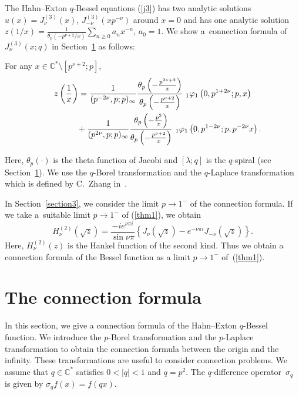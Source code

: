 \documentclass[pdftex]{sigma}
\begin{document}
The Hahn--Exton $q$-Bessel equations (\ref{j3}) has two analytic solutions $u(x)=J_\nu^{(3)}(x)$, $J_{-\nu}^{(3)}(xp^{-\nu})$ around $x=0$ and has one analytic solution
$z\left(1/x\right)
=\frac{1}{\theta_p\left(-p^{\nu +2}/x\right)}\sum\limits_{n\ge 0}a_nx^{-n}$, $a_0=1$. We show a~connection formula of $J_\nu^{(3)}(x;q)$ in Section~\ref{section2} as follows:
\begin{theorem}\label{theorem1}
For any
$x\in\mathbb{C}^*\setminus [p^{\nu +2};p]$,
\begin{gather}
z\left(\frac{1}{x}\right) =\frac{1}{(p^{-2\nu},p;p)_\infty}\frac{\theta
_p\left(-\frac{p^{2\nu +2}}{x}\right)}{
\theta_p\left(-\frac{p^{\nu +2}}{x}\right)}\
_1\varphi_1\left(0,p^{1+2\nu};p,x\right)\notag\\
\phantom{z\left(\frac{1}{x}\right) =}{} +\frac{1}{(p^{2\nu},p;p)_\infty}\frac{\theta _p\left(-\frac{p^2}{x}\right)}{
\theta_p\left(-\frac{p^{\nu +2}}{x}\right)}\
_1\varphi_1\left(0,p^{1-2\nu};p,p^{-2\nu}x\right).\label{thm1}
\end{gather}
\end{theorem}
Here, $\theta_p(\cdot )$ is the theta function of Jacobi and $[\lambda ;q]$ is the $q$-spiral (see Section~\ref{section2}).
We use the $q$-Borel transformation and the $q$-Laplace transformation which is def\/ined by C.~Zhang in~\cite{Z1}.

In Section~\ref{section3}, we consider the limit $p\to 1^-$ of the connection formula. If we take a~suitable limit $p\to 1^-$ of (\ref{thm1}), we obtain
\[
H_\nu^{(2)}\left(\sqrt{z}\right)=\frac{-ie^{\nu\pi i}}{\sin\nu\pi}\left\{J_\nu\left(\sqrt{z}\right)-e^{-\nu\pi i}J_{-\nu}\left(\sqrt{z}\right)\right\}.
\]
Here, $H_\nu^{(2)}(z)$ is the Hankel function of the second kind. Thus we obtain a connection formula of the Bessel function as a limit $p\to 1^-$ of~(\ref{thm1}).


\section{The connection formula}\label{section2}

In this section, we give a connection formula of the Hahn--Exton $q$-Bessel function. We introduce the $p$-Borel transformation and the $p$-Laplace transformation to obtain the connection formula between the origin and the inf\/inity. These transformations are useful to consider connection problems. We assume that $q\in\mathbb{C}^*$ satisf\/ies $0< |q|<1$ and $q=p^2$. The $q$-dif\/ference opera\-tor~$\sigma_q$ is given by $\sigma_qf(x)=f(qx)$.
\end{document}
